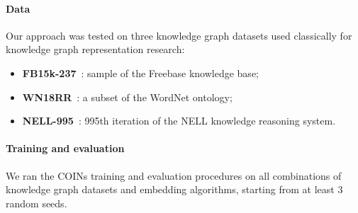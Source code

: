 
\paragraph{Data}

Our approach was tested on three knowledge graph datasets used classically for knowledge graph representation research:
\begin{itemize}
    \item \textbf{FB15k-237}~\cite{toutanova_observed_2015}: sample of the Freebase knowledge base;
    \item \textbf{WN18RR}~\cite{dettmers_convolutional_2018}: a subset of the WordNet ontology;
    \item \textbf{NELL-995}~\cite{xiong_deeppath_2017}: 995th iteration of the NELL knowledge reasoning system.
\end{itemize}

\paragraph{Training and evaluation}
We ran the COINs training and evaluation procedures on all combinations of knowledge graph datasets and embedding algorithms, starting from at least 3 random seeds. 

